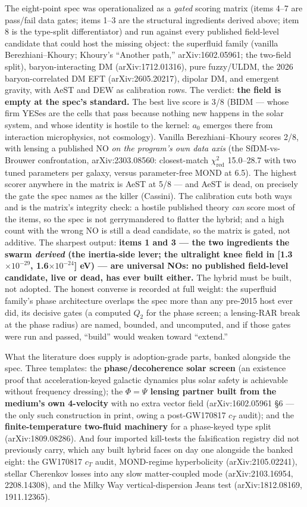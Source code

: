 \documentclass[11pt,a4paper]{article}
\begin{document}
The eight-point spec was operationalized as a \emph{gated} scoring matrix (items 4--7 are pass/fail data gates; items 1--3 are the structural ingredients derived above; item 8 is the type-split differentiator) and run against every published field-level candidate that could host the missing object: the superfluid family (vanilla Berezhiani--Khoury; Khoury's ``Another path,'' arXiv:1602.05961; the two-field split), baryon-interacting DM (arXiv:1712.01316), pure fuzzy/ULDM, the 2026 baryon-correlated DM EFT (arXiv:2605.20217), dipolar DM, and emergent gravity, with AeST and DEW as calibration rows. The verdict: \textbf{the field is empty at the spec's standard.} The best live score is 3/8 (BIDM --- whose firm YESes are the cells that pass because nothing new happens in the solar system, and whose identity is hostile to the kernel: $a_{0}$ emerges there from interaction microphysics, not cosmology). Vanilla Berezhiani--Khoury scores 2/8, with lensing a published NO \emph{on the program's own data axis} (the SfDM-vs-Brouwer confrontation, arXiv:2303.08560: closest-match $\chi^2_{\mathrm{red}}$ 15.0--28.7 with two tuned parameters per galaxy, versus parameter-free MOND at 6.5). The highest scorer anywhere in the matrix is AeST at 5/8 --- and AeST is dead, on precisely the gate the spec names as the killer (Cassini). The calibration cuts both ways and is the matrix's integrity check: a hostile published theory \emph{can} score most of the items, so the spec is not gerrymandered to flatter the hybrid; and a high count with the wrong NO is still a dead candidate, so the matrix is gated, not additive. The sharpest output: \textbf{items 1 and 3 --- the two ingredients the swarm \emph{derived} (the inertia-side lever; the ultralight knee field in [1.3$\times10^{-29}$, 1.6$\times10^{-24}$] eV) --- are universal NOs: no published field-level candidate, live or dead, has ever built either.} The hybrid must be built, not adopted. The honest converse is recorded at full weight: the superfluid family's phase architecture overlaps the spec more than any pre-2015 host ever did, its decisive gates (a computed $Q_2$ for the phase screen; a lensing-RAR break at the phase radius) are named, bounded, and uncomputed, and if those gates were run and passed, ``build'' would weaken toward ``extend.''

What the literature does supply is adoption-grade parts, banked alongside the spec. Three templates: the \textbf{phase/decoherence solar screen} (an existence proof that acceleration-keyed galactic dynamics plus solar safety is achievable without frequency dressing); the \textbf{$\Phi = \Psi$ lensing partner built from the medium's own 4-velocity} with no extra vector field (arXiv:1602.05961 \S{}6 --- the only such construction in print, owing a post-GW170817 $c_T$ audit); and the \textbf{finite-temperature two-fluid machinery} for a phase-keyed type split (arXiv:1809.08286). And four imported kill-tests the falsification registry did not previously carry, which any built hybrid faces on day one alongside the banked eight: the GW170817 $c_T$ audit, MOND-regime hyperbolicity (arXiv:2105.02241), stellar Cherenkov losses into any slow matter-coupled mode (arXiv:2103.16954, 2208.14308), and the Milky Way vertical-dispersion Jeans test (arXiv:1812.08169, 1911.12365).
\end{document}
